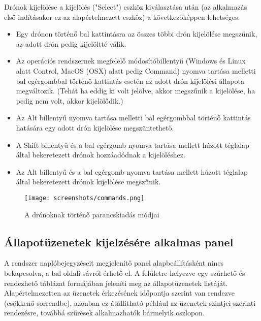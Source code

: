Drónok kijelölése a kijelölés ("Select") eszköz kiválasztása után (az alkalmazás
első indításakor ez az alapértelmezett eszköz) a következőképpen lehetséges:
\begin{itemize}

  \item Egy drónon történő bal kattintásra az összes többi drón kijelölése
  megszűnik, az adott drón pedig kijelöltté válik.

  \item Az operációs rendszernek megfelelő módosítóbillentyű (Windows és Linux
  alatt Control, MacOS (OSX) alatt pedig Command) nyomva tartása melletti bal
  egérgombbal történő kattintás esetén az adott drón kijelölési állapota
  megváltozik. (Tehát ha eddig ki volt jelölve, akkor megszűnik a kijelölése, ha
  pedig nem volt, akkor kijelölődik.)

  \item Az Alt billentyű nyomva tartása melletti bal egérgombbal történő
  kattintás hatására egy adott drón kijelölése megszüntethető.

  \item A Shift billentyű és a bal egérgomb nyomva tartása mellett húzott
  téglalap által bekeretezett drónok hozzáadódnak a kijelöléshez.

  \item Az Alt billentyű és a bal egérgomb nyomva tartása mellett húzott
  téglalap által bekeretezett drónok kijelölése megszűnik.

\end{itemize}

\begin{figure}[H]
  \texttt{[image: screenshots/commands.png]}
  \caption{A drónoknak történő parancskiadás módjai}
  \label{fig:commands}
\end{figure}


\subsection{Állapotüzenetek kijelzésére alkalmas panel}

A rendszer naplóbejegyzéseit megjelenítő panel alapbeállításként nincs
bekapcsolva, a bal oldali sávról érhető el. A felületre helyezve egy szűrhető
és rendezhető táblázat formájában jeleníti meg az állapotüzenetek listáját.
Alapértelmezetten az üzenetek érkezésének időpontja szerint van rendezve
(csökkenő sorrendbe), azonban ez átállítható például az üzenetek szintjei
szerinti rendezésre, továbbá szűrések alkalmazhatók bármelyik oszlopon.

